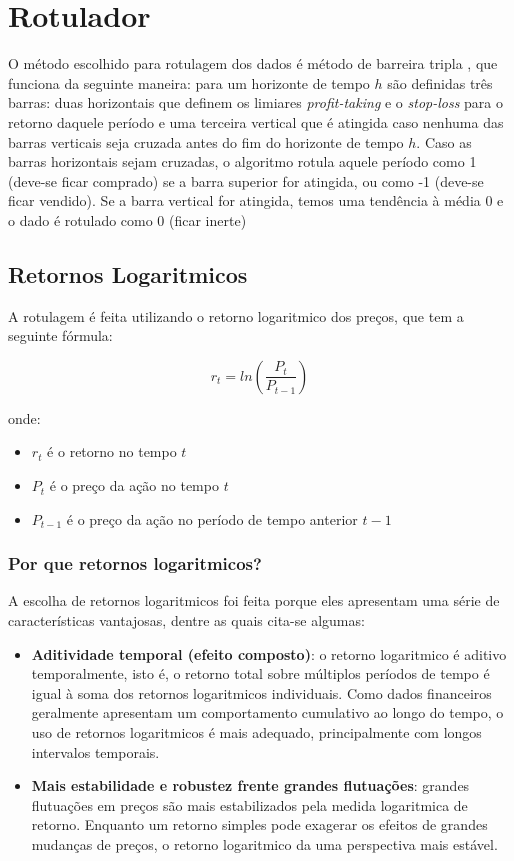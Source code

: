 \documentclass{article}
\begin{document}
\newpage

\section{Rotulador}

O método escolhido para rotulagem dos dados é método de barreira tripla \cite{Prado}, que funciona da seguinte maneira: para um horizonte de tempo $h$ são definidas três barras: duas horizontais que definem os limiares \textit{profit-taking} e o \textit{stop-loss} para o retorno daquele período e uma terceira vertical que é atingida caso nenhuma das barras verticais seja cruzada antes do fim do horizonte de tempo $h$. Caso as barras horizontais sejam cruzadas, o algoritmo rotula aquele período como 1 (deve-se ficar comprado) se a barra superior for atingida, ou como -1 (deve-se ficar vendido). Se a barra vertical for atingida, temos uma tendência à média 0 e o dado é rotulado como 0 (ficar inerte)

\subsection{Retornos Logaritmicos}

A rotulagem é feita utilizando o retorno logaritmico dos preços, que tem a seguinte fórmula:

$$ r_t = ln \left( \frac{P_t}{P_{t - 1}} \right) $$

onde:
\begin{itemize}
    \item $r_t$ é o retorno no tempo $t$
    \item ${P_t}$ é o preço da ação no tempo $t$
    \item $P_{t - 1}$ é o preço da ação no período de tempo anterior $t - 1$
\end{itemize}

\subsubsection{Por que retornos logaritmicos?}

A escolha de retornos logaritmicos foi feita porque eles apresentam uma série de características vantajosas, dentre as quais cita-se algumas:

\begin{itemize}
    \item \textbf{Aditividade temporal (efeito composto)}: o retorno logaritmico é aditivo temporalmente, isto é, o retorno total sobre múltiplos períodos de tempo é igual à soma dos retornos logaritmicos individuais. Como dados financeiros geralmente apresentam um comportamento cumulativo ao longo do tempo, o uso de retornos logaritmicos é mais adequado, principalmente com longos intervalos temporais. \cite{Hull}
    \item \textbf{Mais estabilidade e robustez frente grandes flutuações}: grandes flutuações em preços são mais estabilizados pela medida logaritmica de retorno. Enquanto um retorno simples pode exagerar os efeitos de grandes mudanças de preços, o retorno logaritmico da uma perspectiva mais estável. \cite{Bouchaud}
\end{itemize}
\end{document}
